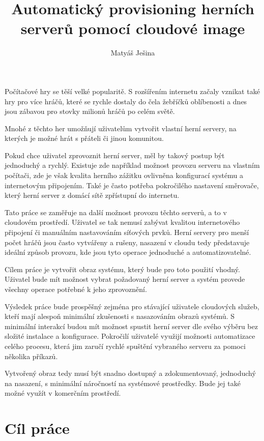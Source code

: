 \documentclass[thesis=B,czech]{FITthesis}[2019/12/23]
\title{Automatický provisioning herních serverů pomocí cloudové image}
\author{Matyáš Ješina} %
\begin{document}

\begin{introduction}

Počítačové hry se těší velké popularitě. S rozšířením internetu začaly vznikat také hry
pro více hráčů, které se rychle dostaly do čela žebříčků oblíbenosti a dnes jsou zábavou pro stovky milionů
hráčů po celém světě.

Mnohé z těchto her umožňují uživatelům vytvořit vlastní herní servery, na kterých je možné hrát s přáteli
či jinou komunitou.

Pokud chce uživatel zprovoznit herní server, měl by takový postup být jednoduchý a rychlý.
Existuje zde například možnost provozu serveru na vlastním počítači, zde je však kvalita herního zážitku 
ovlivněna konfigurací systému a internetovým připojením. Také je často potřeba pokročilého nastavení
směrovače, který herní server z domácí sítě zpřístupní do internetu.

Tato práce se zaměřuje na další možnost provozu těchto serverů, a to v cloudovém prostředí. Uživatel se tak nemusí zabývat 
kvalitou internetového připojení či manuálním nastavováním síťových prvků. Herní servery
pro menší počet hráčů jsou často vytvářeny a rušeny, nasazení v cloudu tedy představuje ideální způsob provozu,
kde jsou tyto operace jednoduché a automatizovatelné.

Cílem práce je vytvořit obraz systému, který bude pro toto použití vhodný. Uživatel bude mít možnost vybrat
požadovaný herní server a systém provede všechny operace potřebné k jeho zprovoznění.

Výsledek práce bude prospěšný zejména pro stávající uživatele cloudových služeb, kteří mají alespoň minimální
zkušenosti s nasazováním obrazů systémů. S minimální interakcí budou mít možnost spustit herní server dle svého
výběru bez složité instalace a konfigurace. Pokročilí uživatelé využijí možnosti automatizace celého procesu,
která jim zaručí rychlé spuštění vybraného serveru za pomoci několika příkazů.

Vytvořený obraz tedy musí být snadno dostupný a zdokumentovaný, jednoduchý na nasazení, s minimální náročností 
na systémové prostředky. Bude jej také možné využít v komerčním prostředí.

\end{introduction}

\chapter{Cíl práce}
\end{document}
